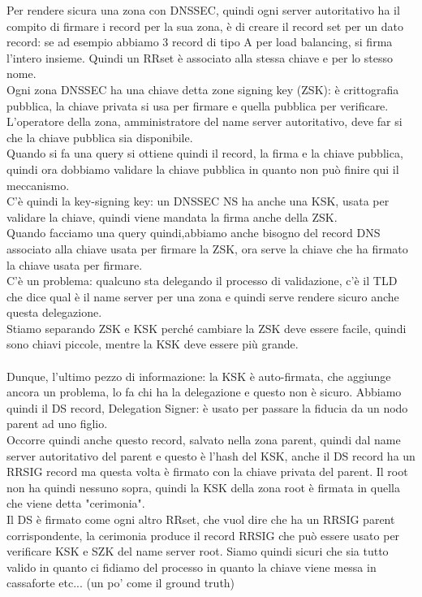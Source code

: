 \documentclass[12pt, oneside]{extbook} %
\begin{document}
Per rendere sicura una zona con DNSSEC, quindi ogni server autoritativo ha il compito di firmare i record per la sua zona, è di creare il record set per un dato record: se ad esempio abbiamo 3 record di tipo A per load balancing, si firma l'intero insieme. Quindi un RRset è associato alla stessa chiave e per lo stesso nome.\\Ogni zona DNSSEC ha una chiave detta zone signing key (ZSK): è crittografia pubblica, la chiave privata si usa per firmare e quella pubblica per verificare.\\L'operatore della zona, amministratore del name server autoritativo, deve far si che la chiave pubblica sia disponibile.\\Quando si fa una query si ottiene quindi il record, la firma e la chiave pubblica, quindi ora dobbiamo validare la chiave pubblica in quanto non può finire qui il meccanismo.\\C'è quindi la key-signing key: un DNSSEC NS ha anche una KSK, usata per validare la chiave, quindi viene mandata la firma anche della ZSK.\\Quando facciamo una query quindi,abbiamo anche bisogno del record DNS associato alla chiave usata per firmare la ZSK, ora serve la chiave che ha firmato la chiave usata per firmare.\\C'è un problema: qualcuno sta delegando il processo di validazione, c'è il TLD che dice qual è il name server per una zona e quindi serve rendere sicuro anche questa delegazione.\\Stiamo separando ZSK e KSK perché cambiare la ZSK deve essere facile, quindi sono chiavi piccole, mentre la KSK deve essere più grande.\\\\Dunque, l'ultimo pezzo di informazione: la KSK è auto-firmata, che aggiunge ancora un problema, lo fa chi ha la delegazione e questo non è sicuro. Abbiamo quindi il DS record, Delegation Signer: è usato per passare la fiducia da un nodo parent ad uno figlio.\\Occorre quindi anche questo record, salvato nella zona parent, quindi dal name server autoritativo del parent e questo è l'hash del KSK, anche il DS record ha un RRSIG record ma questa volta è firmato con la chiave privata del parent. Il root non ha quindi nessuno sopra, quindi la KSK della zona root è firmata in quella che viene detta "cerimonia".\\Il DS è firmato come ogni altro RRset, che vuol dire che ha un RRSIG parent corrispondente, la cerimonia produce il record RRSIG che può essere usato per verificare KSK e SZK del name server root. Siamo quindi sicuri che sia tutto valido in quanto ci fidiamo del processo in quanto la chiave viene messa in cassaforte etc... (un po' come il ground truth)
\end{document}
